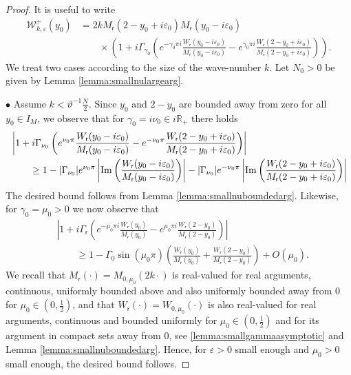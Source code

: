\documentclass[11pt,reqno]{amsproc}
\newcommand{\bullpar}[1]{\vspace{.5em}\noindent $\bullet$ \normalfont {\bfseries #1.}}
\theoremstyle{definition}
\numberwithin{equation}{section}
\newcommand{\R}{{\mathbb R}}
\newcommand{\sr}{{\mathsf{r}}}
\newcommand{\W}{{\mathcal{W}}}
\newcommand{\ep}{\varepsilon}
\def\Im{{\rm Im}}
\begin{document}
\begin{proof}
It is useful to write 
\begin{align*}
\W_{k,\ep}^+(y_0) &= 2k M_{\sr}(2-y_0+i\ep_0)M_{\sr}(y_0-i\ep_0) \\
&\qquad\times\left( 1 + i\Gamma_{\gamma_0} \left( e^{-{\gamma_0}\pi i}\frac{W_{\sr}(y_0-i\ep_0)}{M_{\sr}(y_0-i\ep_0)} - e^{{\gamma_0} \pi i}\frac{W_{\sr}(2-y_0+i\ep_0)}{M_{\sr}(2-y_0+i\ep_0)} \right) \right).
\end{align*}
We treat two cases according to the size of the wave-number $k$. Let $N_0>0$ be given by Lemma \ref{lemma:smallnulargearg}. 

\bullpar{Case 1} Assume $k< \vartheta^{-1}\frac{N}{2}$. Since $y_0$ and $2-y_0$ are bounded away from zero for all $y_0\in I_M$, we observe that for ${\gamma_0} = i\nu_0\in i \R_+$ there holds
\begin{align*}
&\left| 1 + i\Gamma_{\nu_0} \left( e^{{\nu_0}\pi}\frac{W_{\sr}(y_0-i\ep_0)}{M_{\sr}(y_0-i\ep_0)} - e^{-{\nu_0} \pi}\frac{W_{\sr}(2-y_0+i\ep_0)}{M_{\sr}(2-y_0+i\ep_0)} \right) \right| \\
&\qquad\geq 1 - |\Gamma_{\nu_0}|e^{{\nu_0}\pi} \left| \Im \left(\frac{W_{\sr}(y_0-i\ep_0)}{M_{\sr}(y_0-i\ep_0)} \right) \right| - |\Gamma_{\nu_0}|e^{-{\nu_0}\pi } \left| \Im \left( \frac{W_{\sr}(2-y_0+i\ep_0)}{M_{\sr}(2-y_0+i\ep_0)} \right) \right|
\end{align*}
The desired bound follows from Lemma \ref{lemma:smallnuboundedarg}. Likewise, for $\gamma_0 = \mu_0>0$ we now observe that
\begin{align*}
& \left| 1 +i\Gamma_{\sr} \left( e^{-{\mu_0} \pi i} \frac{W_{\sr}(y_0)}{M_{\sr}(y_0)} - e^{{\mu_0}\pi i} \frac{W_{\sr}(2-y_0)}{M_{\sr}(2-y_0)} \right) \right| \\
&\qquad \geq 1 - \Gamma_0\sin({\mu_0}\pi) \left( \frac{W_{\sr}(y_0)}{M_{\sr}(y_0)} + \frac{W_{\sr}(2-y_0)}{M_{\sr}(2-y_0)} \right)  + O({\mu_0}).
\end{align*}
We recall that $M_{\sr}(\cdot)=M_{0,\mu_0}(2k\cdot)$ is real-valued for real arguments, continuous, uniformly bounded above and also uniformly bounded away from 0 for ${\mu_0}\in \left(0,\frac12 \right)$, and that $W_{\sr}(\cdot)=W_{0,\mu_0}(\cdot)$ is also real-valued for real arguments, continuous and bounded uniformly for ${\mu_0}\in \left(0,\frac12 \right)$ and for its argument in compact sets away from 0, see \ref{lemma:smallgammaasymptotic} and Lemma \ref{lemma:smallnuboundedarg}. Hence, for $\ep>0$ small enough and ${\mu_0}>0$ small enough, the desired bound follows.


\end{proof}
\end{document}
